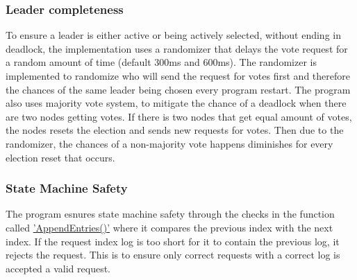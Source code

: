 \documentclass[a4paper,11pt]{article}
\begin{document}
\subsubsection*{Leader completeness}
To ensure a leader is either active or being actively selected, without ending in deadlock, the implementation uses a randomizer that delays the vote request for a random amount of time (default 300ms and 600ms).
The randomizer is implemented to randomize who will send the request for votes first and therefore the chances of the same leader being chosen every program restart. The program also uses majority vote system,
to mitigate the chance of a deadlock when there are two nodes getting votes. If there is two nodes that get equal amount of votes, the nodes resets the election and sends new requests for votes.
Then due to the randomizer, the chances of a non-majority vote happens diminishes for every election reset that occurs.

\subsubsection*{State Machine Safety}
The program esnures state machine safety through the checks in the function called \href{https://github.com/jmsadair/raft/blob/dev/raft.go#L858}{'AppendEntries()'} where it compares the previous index with the next index. 
If the request index log is too short for it to contain the previous log, it rejects the request. This is to ensure only correct requests with a correct log is accepted a valid request.
\end{document}
